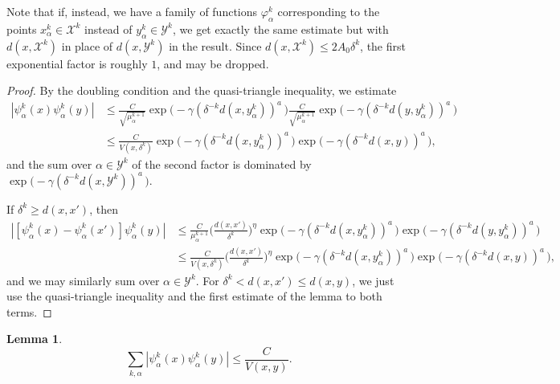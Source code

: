 \documentclass{amsart}
\numberwithin{equation}{section}
\theoremstyle{plain}
\newtheorem{lemma}[equation]{Lemma}
\theoremstyle{definition}
\theoremstyle{remark}
\begin{document}
{{{Note that if, instead, we have a family of functions $\varphi^k_\alpha$ corresponding to the points $x^k_\alpha\in\mathscr{X}^k$ instead of $y^k_\alpha\in\mathscr{Y}^k$, we get exactly the same estimate but with $d(x,\mathscr{X}^k)$ in place of $d(x,\mathscr{Y}^k)$ in the result. Since  $d(x,\mathscr{X}^k)\leq 2A_{0}\delta^k$, the first exponential factor is roughly $1$, and may be dropped.

 
\begin{proof}
By the doubling condition and the quasi-triangle inequality, we estimate
\begin{equation*}
\begin{split}
   {|{\psi^k_\alpha(x)\psi^k_\alpha(y)}|}
   &\leq \frac{C}{\sqrt{\mu^{k+1}_\alpha}}\exp\big(-\gamma (\delta ^{-k}{d(x,y^k_{\alpha})})^a \, \big)
   \frac{C}{\sqrt{\mu^{k+1}_\alpha}}\exp\big(-\gamma (\delta ^{-k}{d(y,y^k_\alpha)})^a \, \big) \\
   &\leq \frac{C}{V(x,\delta^k)}\exp\big(-\gamma (\delta ^{-k}{d(x,y^k_{\alpha})})^a \, \big)\exp\big(-\gamma (\delta ^{-k}{d(x,y)})^a \, \big),
\end{split}
\end{equation*}
and the sum over $\alpha\in \mathscr{Y}^k$ of the second factor is dominated by $\exp\big(-\gamma (\delta ^{-k}d(x,\mathscr{Y}^k))^a \, \big)$.

If $\delta^k\geq d(x,x')$, then
\begin{equation*}
\begin{split}
  {|{[\psi^k_\alpha(x)-\psi^k_\alpha(x')]\psi^k_\alpha(y)}|}
  &\leq\frac{C}{\mu^{k+1}_\alpha}\Big(\frac{d(x,x')}{\delta^k}\Big)^{\eta}\exp\big(-\gamma (\delta ^{-k}{d(x,y^k_{\alpha})})^a \, \big)
    \exp\big(-\gamma (\delta ^{-k}{d(y,y^k_{\alpha})})^a \, \big) \\
  &\leq\frac{C}{V(x,\delta^k)}\Big(\frac{d(x,x')}{\delta^k}\Big)^{\eta}\exp\big(-\gamma (\delta ^{-k}{d(x,y^k_{\alpha})})^a \, \big)\exp\big(-\gamma (\delta ^{-k}{d(x,y)})^a \, \big),
\end{split}
\end{equation*}
and we may similarly sum over $\alpha\in\mathscr{Y}^k$. For $\delta^k<d(x,x')\leq d(x,y)$, we just use the {quasi-triangle} inequality and the first estimate of the lemma to both terms.
\end{proof}
 
\begin{lemma}\label{lem:sumAlphaK}
\begin{equation*}
  \sum_{k,\alpha}{|{\psi^k_\alpha(x)\psi^k_\alpha(y)}|}
  \leq\frac{C}{V(x,y)}.
\end{equation*}
\end{lemma}
 
}}}
\end{document}
